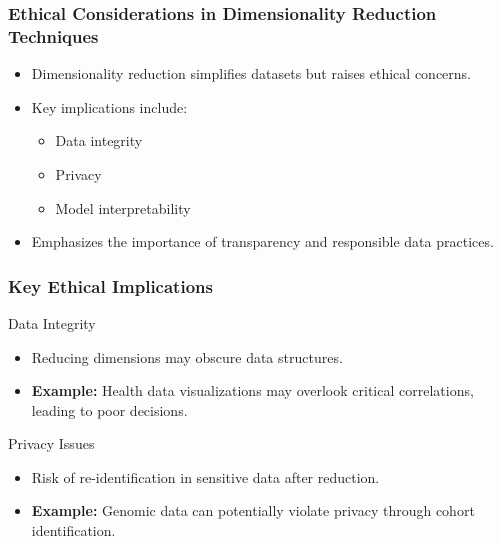 \documentclass[aspectratio=169]{beamer}
\begin{document}
\begin{frame}[fragile]
  \frametitle{Ethical Considerations in Dimensionality Reduction Techniques}
  
  \begin{itemize}
    \item Dimensionality reduction simplifies datasets but raises ethical concerns.
    \item Key implications include:
      \begin{itemize}
        \item Data integrity
        \item Privacy
        \item Model interpretability
      \end{itemize}
    \item Emphasizes the importance of transparency and responsible data practices.
  \end{itemize}
  
\end{frame}

\begin{frame}[fragile]
  \frametitle{Key Ethical Implications}
  
  \begin{block}{Data Integrity}
    \begin{itemize}
      \item Reducing dimensions may obscure data structures.
      \item \textbf{Example:} Health data visualizations may overlook critical correlations, leading to poor decisions.
    \end{itemize}
  \end{block}
  
  \begin{block}{Privacy Issues}
    \begin{itemize}
      \item Risk of re-identification in sensitive data after reduction.
      \item \textbf{Example:} Genomic data can potentially violate privacy through cohort identification.
    \end{itemize}
  \end{block}
  
\end{frame}
\end{document}

